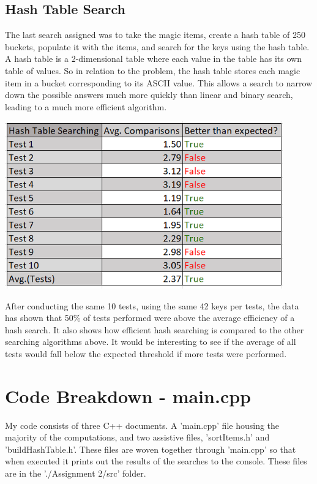 \documentclass[12pt, letterpaper]{article}
\begin{document}
\subsection{Hash Table Search} \label{HshTblSch}
The last search assigned was to take the magic items, create a hash table of 250 buckets, populate it with the items, and search for the keys using the hash table.
A hash table is a 2-dimensional table where each value in the table has its own table of values.
\newline
\indent So in relation to the problem, the hash table stores each magic item in a bucket corresponding to its ASCII value.
This allows a search to narrow down the possible answers much more quickly than linear and binary search, leading to a much more efficient algorithm.
\begin{center}
   \includegraphics[width=120mm,scale=0.5]{HshSearch.png}
\end{center}
After conducting the same 10 tests, using the same 42 keys per tests, the data has shown that 50\% of tests performed were above the average efficiency of a hash search.
It also shows how efficient hash searching is compared to the other searching algorithms above.
It would be interesting to see if the average of all tests would fall below the expected threshold if more tests were performed.

\section{Code Breakdown - main.cpp}
My code consists of three C++ documents. 
A 'main.cpp' file housing the majority of the computations, and two assistive files, 'sortItems.h' and 'buildHashTable.h'.
These files are woven together through 'main.cpp' so that when executed it prints out the results of the searches to the console.
These files are in the './Assignment 2/src' folder.
\end{document}
